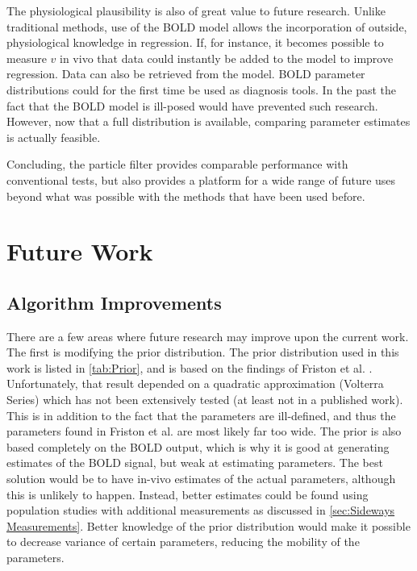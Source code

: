 The physiological plausibility is also of great value to future
research. Unlike traditional methods, use of the \ac{BOLD} model allows
the incorporation of outside, physiological knowledge in regression.
If, for instance, it becomes possible to measure $v$ in vivo that data
could instantly be added to the model to improve regression. Data can
also be retrieved from the model. \ac{BOLD} parameter distributions could
for the first time be used as diagnosis tools. In the past the fact
that the \ac{BOLD} model is ill-posed would have prevented such research. 
However, now that a full
distribution is available, comparing parameter estimates is actually
feasible.

Concluding, the particle filter provides comparable performance with
conventional tests, but also provides a platform for a wide range of
future uses beyond what was possible with the methods that have been
used before.

\section{Future Work}
\label{sec:FutureWork}
\subsection{Algorithm Improvements}
\label{sec:Particle Filter Variations}
There are a few areas where future research may improve upon the current
work. The first is modifying the prior
distribution. The prior distribution used in this work is listed in \autoref{tab:Prior},
and is based on the findings of Friston et al. \cite{Friston2002b}. Unfortunately, that
result depended on a quadratic approximation (Volterra Series) which has
not been extensively tested (at least not in a published work).
This is in addition to the fact that the parameters are ill-defined, and
thus the parameters found in Friston et al. \cite{Friston2002b} are most likely far too wide.
The prior is also
based completely on the \ac{BOLD} output, which is why it is good at generating
estimates of the \ac{BOLD} signal, but weak at estimating parameters.
The best solution would be to have
in-vivo estimates of the actual parameters, although this
is unlikely to happen. Instead, better estimates could be found
using population studies with additional measurements as discussed in
\autoref{sec:Sideways Measurements}. Better knowledge of the prior distribution
would make it possible to decrease variance of certain
parameters, reducing the mobility of the parameters.

